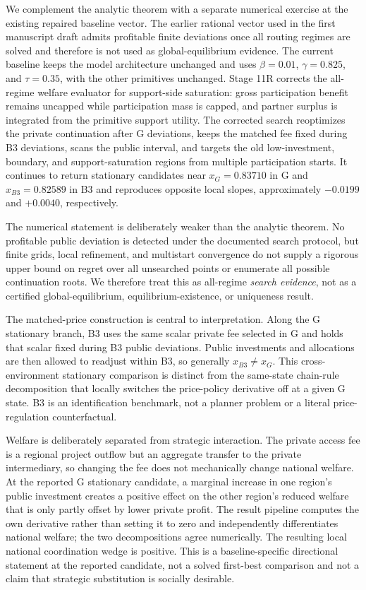We complement the analytic theorem with a separate numerical exercise at the existing repaired baseline vector. The earlier rational vector used in the first manuscript draft admits profitable finite deviations once all routing regimes are solved and therefore is not used as global-equilibrium evidence. The current baseline keeps the model architecture unchanged and uses $\beta=0.01$, $\gamma=0.825$, and $\tau=0.35$, with the other primitives unchanged. Stage 11R corrects the all-regime welfare evaluator for support-side saturation: gross participation benefit remains uncapped while participation mass is capped, and partner surplus is integrated from the primitive support utility. The corrected search reoptimizes the private continuation after G deviations, keeps the matched fee fixed during B3 deviations, scans the public interval, and targets the old low-investment, boundary, and support-saturation regions from multiple participation starts. It continues to return stationary candidates near $x_G=0.83710$ in G and $x_{B3}=0.82589$ in B3 and reproduces opposite local slopes, approximately $-0.0199$ and $+0.0040$, respectively.

The numerical statement is deliberately weaker than the analytic theorem. No profitable public deviation is detected under the documented search protocol, but finite grids, local refinement, and multistart convergence do not supply a rigorous upper bound on regret over all unsearched points or enumerate all possible continuation roots. We therefore treat this as all-regime \emph{search evidence}, not as a certified global-equilibrium, equilibrium-existence, or uniqueness result.

The matched-price construction is central to interpretation. Along the G stationary branch, B3 uses the same scalar private fee selected in G and holds that scalar fixed during B3 public deviations. Public investments and allocations are then allowed to readjust within B3, so generally $x_{B3}\neq x_G$. This cross-environment stationary comparison is distinct from the same-state chain-rule decomposition that locally switches the price-policy derivative off at a given G state. B3 is an identification benchmark, not a planner problem or a literal price-regulation counterfactual.

Welfare is deliberately separated from strategic interaction. The private access fee is a regional project outflow but an aggregate transfer to the private intermediary, so changing the fee does not mechanically change national welfare. At the reported G stationary candidate, a marginal increase in one region's public investment creates a positive effect on the other region's reduced welfare that is only partly offset by lower private profit. The result pipeline computes the own derivative rather than setting it to zero and independently differentiates national welfare; the two decompositions agree numerically. The resulting local national coordination wedge is positive. This is a baseline-specific directional statement at the reported candidate, not a solved first-best comparison and not a claim that strategic substitution is socially desirable.

